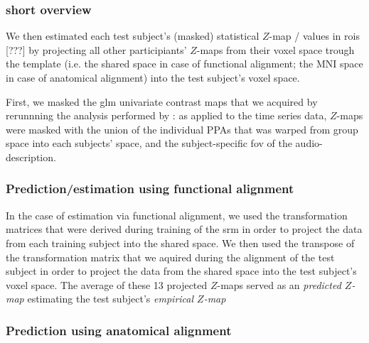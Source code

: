 
\subsubsection{short overview}
%
We then estimated each test subject's (masked) statistical $Z$-map / values in
\acp{roi} [???] by projecting all other participiants' $Z$-maps from their voxel
space trough the template (i.e. the shared space in case of functional
alignment; the MNI space in case of anatomical alignment) into the test
subject's voxel space.

%
First, we masked the \ac{glm} univariate contrast maps that we acquired by
rerunnning the analysis performed by \citet{sengupta2016extensiondata}:
%
as applied to the time series data, $Z$-maps were masked with the union of the
individual PPAs \citep[s.][]{haeusler2022processing} that was warped from
group space into each subjects' space, and the subject-specific \ac{fov} of the
audio-description.

\subsubsection{Prediction/estimation using functional alignment}

In the case of estimation via functional alignment, we used the transformation
matrices that were derived during training of the \ac{srm} in order to project
the data from each training subject into the shared space.
We then used the transpose of the transformation matrix that we aquired during
the alignment of the test subject in order to project the data from the shared
space into the test subject's voxel space.
The average of these 13 projected $Z$-maps served as an \textit{predicted
$Z$-map} estimating the test subject's \textit{empirical $Z$-map}


\subsubsection{Prediction using anatomical alignment}


